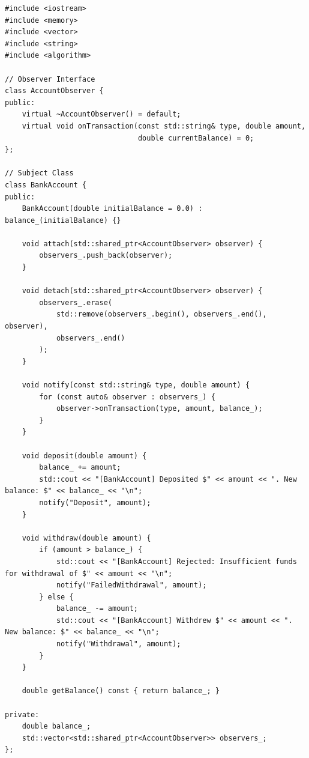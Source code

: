 \documentclass[12pt,a4paper]{article}
\begin{document}
\begin{lstlisting}[caption=Observer Interface and BankAccount Subject Implementation (\texttt{pattern.cpp})]
#include <iostream>
#include <memory>
#include <vector>
#include <string>
#include <algorithm>

// Observer Interface
class AccountObserver {
public:
    virtual ~AccountObserver() = default;
    virtual void onTransaction(const std::string& type, double amount,
                               double currentBalance) = 0;
};

// Subject Class
class BankAccount {
public:
    BankAccount(double initialBalance = 0.0) : balance_(initialBalance) {}

    void attach(std::shared_ptr<AccountObserver> observer) {
        observers_.push_back(observer);
    }

    void detach(std::shared_ptr<AccountObserver> observer) {
        observers_.erase(
            std::remove(observers_.begin(), observers_.end(), observer),
            observers_.end()
        );
    }

    void notify(const std::string& type, double amount) {
        for (const auto& observer : observers_) {
            observer->onTransaction(type, amount, balance_);
        }
    }

    void deposit(double amount) {
        balance_ += amount;
        std::cout << "[BankAccount] Deposited $" << amount << ". New balance: $" << balance_ << "\n";
        notify("Deposit", amount);
    }

    void withdraw(double amount) {
        if (amount > balance_) {
            std::cout << "[BankAccount] Rejected: Insufficient funds for withdrawal of $" << amount << "\n";
            notify("FailedWithdrawal", amount);
        } else {
            balance_ -= amount;
            std::cout << "[BankAccount] Withdrew $" << amount << ". New balance: $" << balance_ << "\n";
            notify("Withdrawal", amount);
        }
    }

    double getBalance() const { return balance_; }

private:
    double balance_;
    std::vector<std::shared_ptr<AccountObserver>> observers_;
};
\end{lstlisting}
\end{document}
